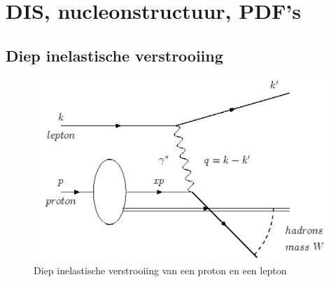 \documentclass[../main.tex]{subfiles}
\begin{document}
\section{DIS, nucleonstructuur, PDF's}%
\label{sec:dis_nucleon_structuur_pdf_s}

\subsection{Diep inelastische verstrooiing}%
\label{sub:diep_inelastische_verstrooiing}

\begin{figure}[h]
    \centering
    \includegraphics[width=0.8\linewidth]{DIS_nucleon_structuur_pdf/diep_in_ver.png}
    \caption{Diep inelastische verstrooiing van een proton en een lepton}%
    \label{fig:diep_in_ver}
\end{figure}
\end{document}
